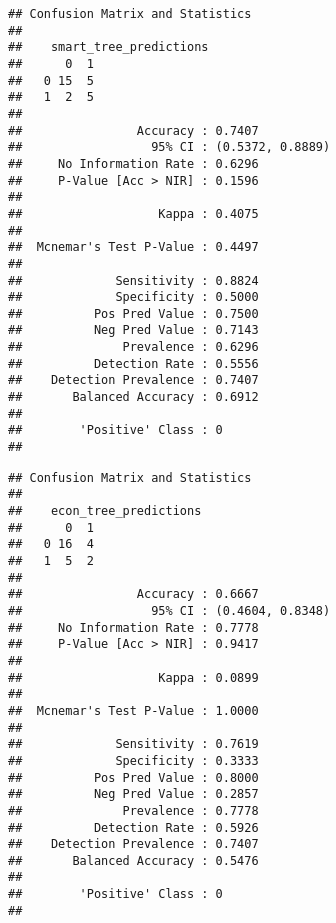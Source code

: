 \documentclass[
]{article}
\newenvironment{Shaded}{\begin{snugshade}}{\end{snugshade}}
\newcommand{\AttributeTok}[1]{\textcolor[rgb]{0.77,0.63,0.00}{#1}}
\newcommand{\FunctionTok}[1]{\textcolor[rgb]{0.00,0.00,0.00}{#1}}
\newcommand{\NormalTok}[1]{#1}
\newcommand{\OtherTok}[1]{\textcolor[rgb]{0.56,0.35,0.01}{#1}}
\newcommand{\SpecialCharTok}[1]{\textcolor[rgb]{0.00,0.00,0.00}{#1}}
\newcommand{\StringTok}[1]{\textcolor[rgb]{0.31,0.60,0.02}{#1}}
\begin{document}
\begin{verbatim}
## Confusion Matrix and Statistics
## 
##    smart_tree_predictions
##      0  1
##   0 15  5
##   1  2  5
##                                           
##                Accuracy : 0.7407          
##                  95% CI : (0.5372, 0.8889)
##     No Information Rate : 0.6296          
##     P-Value [Acc > NIR] : 0.1596          
##                                           
##                   Kappa : 0.4075          
##                                           
##  Mcnemar's Test P-Value : 0.4497          
##                                           
##             Sensitivity : 0.8824          
##             Specificity : 0.5000          
##          Pos Pred Value : 0.7500          
##          Neg Pred Value : 0.7143          
##              Prevalence : 0.6296          
##          Detection Rate : 0.5556          
##    Detection Prevalence : 0.7407          
##       Balanced Accuracy : 0.6912          
##                                           
##        'Positive' Class : 0               
## 
\end{verbatim}

\begin{Shaded}
\end{Shaded}

\begin{verbatim}
## Confusion Matrix and Statistics
## 
##    econ_tree_predictions
##      0  1
##   0 16  4
##   1  5  2
##                                           
##                Accuracy : 0.6667          
##                  95% CI : (0.4604, 0.8348)
##     No Information Rate : 0.7778          
##     P-Value [Acc > NIR] : 0.9417          
##                                           
##                   Kappa : 0.0899          
##                                           
##  Mcnemar's Test P-Value : 1.0000          
##                                           
##             Sensitivity : 0.7619          
##             Specificity : 0.3333          
##          Pos Pred Value : 0.8000          
##          Neg Pred Value : 0.2857          
##              Prevalence : 0.7778          
##          Detection Rate : 0.5926          
##    Detection Prevalence : 0.7407          
##       Balanced Accuracy : 0.5476          
##                                           
##        'Positive' Class : 0               
## 
\end{verbatim}
\end{document}
